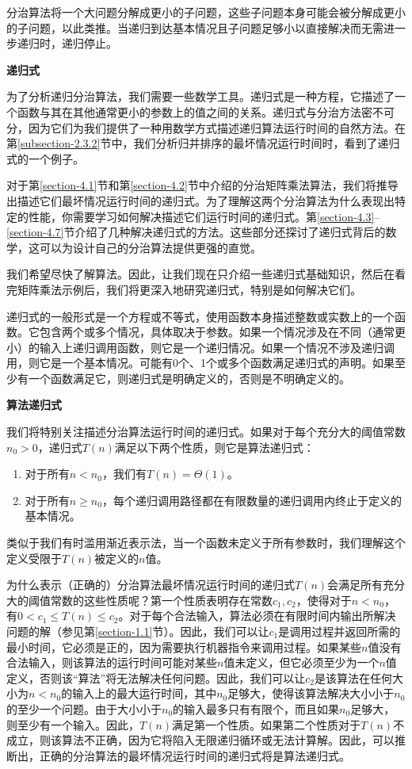 \documentclass[lang=cn,newtx,10pt,scheme=chinese]{elegantbook}
\begin{document}
分治算法将一个大问题分解成更小的子问题，这些子问题本身可能会被分解成更小的子问题，以此类推。当递归到达基本情况且子问题足够小以直接解决而无需进一步递归时，递归停止。

\textbf{递归式}

为了分析递归分治算法，我们需要一些数学工具。递归式是一种方程，它描述了一个函数与其在其他通常更小的参数上的值之间的关系。递归式与分治方法密不可分，因为它们为我们提供了一种用数学方式描述递归算法运行时间的自然方法。在第\ref{subsection-2.3.2}节中，我们分析归并排序的最坏情况运行时间时，看到了递归式的一个例子。

对于第\ref{section-4.1}节和第\ref{section-4.2}节中介绍的分治矩阵乘法算法，我们将推导出描述它们最坏情况运行时间的递归式。为了理解这两个分治算法为什么表现出特定的性能，你需要学习如何解决描述它们运行时间的递归式。第\ref{section-4.3}--\ref{section-4.7}节介绍了几种解决递归式的方法。这些部分还探讨了递归式背后的数学，这可以为设计自己的分治算法提供更强的直觉。

我们希望尽快了解算法。因此，让我们现在只介绍一些递归式基础知识，然后在看完矩阵乘法示例后，我们将更深入地研究递归式，特别是如何解决它们。

递归式的一般形式是一个方程或不等式，使用函数本身描述整数或实数上的一个函数。它包含两个或多个情况，具体取决于参数。如果一个情况涉及在不同（通常更小）的输入上递归调用函数，则它是一个递归情况。如果一个情况不涉及递归调用，则它是一个基本情况。可能有0个、1个或多个函数满足递归式的声明。如果至少有一个函数满足它，则递归式是明确定义的，否则是不明确定义的。

\textbf{算法递归式}

我们将特别关注描述分治算法运行时间的递归式。如果对于每个充分大的阈值常数$n_0>0$，递归式$T(n)$满足以下两个性质，则它是算法递归式：

\begin{enumerate}
\item 对于所有$n<n_0$，我们有$T(n)=\Theta(1)$。
\item 对于所有$n \geq n_0$，每个递归调用路径都在有限数量的递归调用内终止于定义的基本情况。
\end{enumerate}

类似于我们有时滥用渐近表示法，当一个函数未定义于所有参数时，我们理解这个定义受限于$T(n)$被定义的$n$值。

为什么表示（正确的）分治算法最坏情况运行时间的递归式$T(n)$会满足所有充分大的阈值常数的这些性质呢？第一个性质表明存在常数$c_1, c_2$，使得对于$n<n_0$，有$0<c_1 \leq T(n) \leq c_2$。对于每个合法输入，算法必须在有限时间内输出所解决问题的解（参见第\ref{section-1.1}节）。因此，我们可以让$c_1$是调用过程并返回所需的最小时间，它必须是正的，因为需要执行机器指令来调用过程。如果某些$n$值没有合法输入，则该算法的运行时间可能对某些$n$值未定义，但它必须至少为一个$n$值定义，否则该“算法”将无法解决任何问题。因此，我们可以让$c_2$是该算法在任何大小为$n<n_0$的输入上的最大运行时间，其中$n_0$足够大，使得该算法解决大小小于$n_0$的至少一个问题。由于大小小于$n_0$的输入最多只有有限个，而且如果$n_0$足够大，则至少有一个输入。因此，$T(n)$满足第一个性质。如果第二个性质对于$T(n)$不成立，则该算法不正确，因为它将陷入无限递归循环或无法计算解。因此，可以推断出，正确的分治算法的最坏情况运行时间的递归式将是算法递归式。
\end{document}
